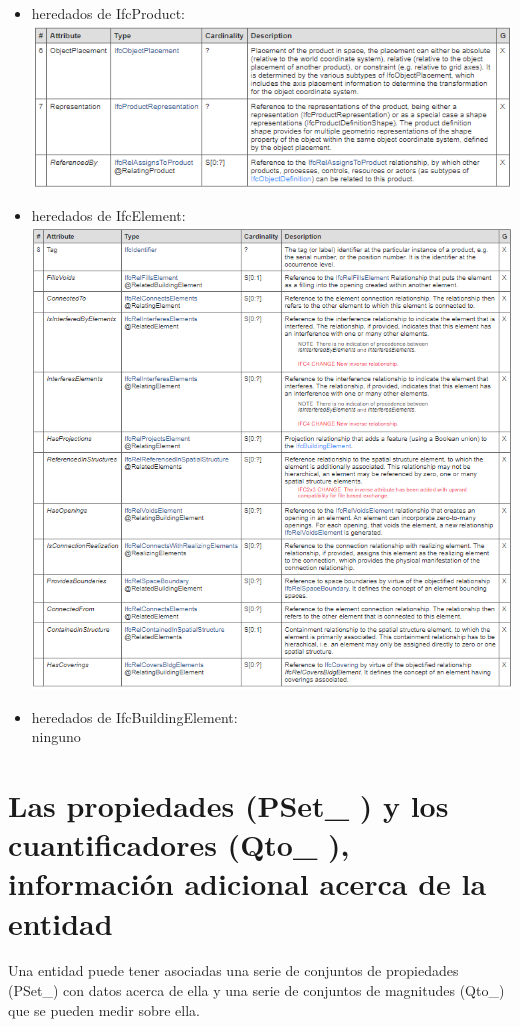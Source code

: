 \documentclass[spanish,12pt,a4paper,final,oneside]{book}
\begin{document}
\begin{itemize}
\item heredados de IfcProduct:
\\ \includegraphics[width=.8\textwidth]{atributos de IfcProduct}

\item heredados de IfcElement:
\\ \includegraphics[width=.8\textwidth]{atributos de IfcElement}

\item heredados de IfcBuildingElement:
\\ninguno
\end{itemize}



\section{Las \textbf{propiedades} (PSet\_ ) y los \textbf{cuantificadores} (Qto\_ ), información adicional acerca de la entidad}

Una entidad puede tener asociadas una serie de conjuntos de propiedades (PSet\_) con datos acerca de ella y una serie de conjuntos de magnitudes (Qto\_) que se pueden medir sobre ella.
\end{document}
